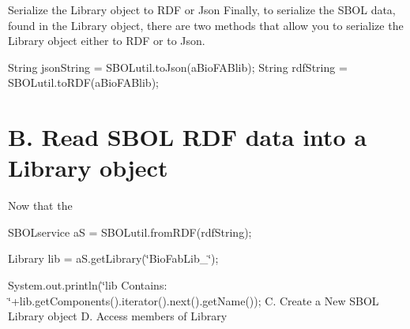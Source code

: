 \begin{DoxyEnumerate}
\item \begin{DoxyParagraph}{Serialize the Library object to RDF or Json}
Finally, to serialize the SBOL data, found in the Library object, there are two methods that allow you to serialize the Library object either to RDF or to Json. \begin{DoxyVerb}
String jsonString = SBOLutil.toJson(aBioFABlib);
String rdfString = SBOLutil.toRDF(aBioFABlib);
\end{DoxyVerb}
 
\end{DoxyParagraph}

\end{DoxyEnumerate}\hypertarget{tutorial_B}{}\section{B. Read SBOL RDF data into a Library object}\label{tutorial_B}
Now that the

SBOLservice aS = SBOLutil.fromRDF(rdfString);

Library lib = aS.getLibrary(\char`\"{}BioFabLib\_\char`\"{});

System.out.println(\char`\"{}lib Contains: \char`\"{}+lib.getComponents().iterator().next().getName()); C. Create a New SBOL Library object D. Access members of Library 